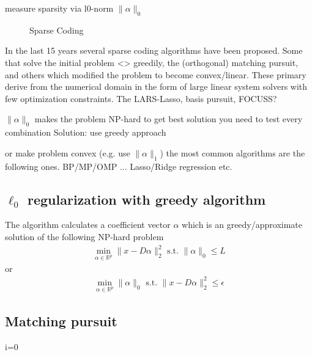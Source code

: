 measure sparsity via       l0-norm       $\lVert\alpha\rVert_{0}$

\begin{figure}
\centering
\caption{Sparse Coding}
\label{fig:da_x}
\end{figure}


In the last 15 years several sparse coding algorithms have been proposed. 
Some that solve the initial problem <> greedily, the (orthogonal) matching pursuit, and others which modified the problem to become convex/linear. These primary derive from the numerical domain in the form of 
large linear system solvers with few optimization constraints. The LARS-Lasso, basis pursuit, FOCUSS?


$\lVert\alpha\rVert_{0}$ makes the problem NP-hard
to get best solution you need to test every combination
Solution:
use greedy approach 

or make problem convex (e.g. use $\lVert\alpha\rVert_{1}$)
the most common algorithms are the following ones.
BP/MP/OMP ...
Lasso/Ridge regression etc.



\subsection {$\ell_0$ regularization with greedy algorithm}

The algorithm calculates a coefficient vector $\alpha$ which is an greedy/approximate solution of the following NP-hard problem
\begin{align}
\min_{\alpha\in\mathbb{R}^{p}}  \lVert x - D\alpha \rVert^{2}_{2} \textrm{ s.t. } \lVert \alpha \rVert_{0} \leq L
\end{align}
or
\begin{align}
\min_{\alpha\in\mathbb{R}^{p}}   \lVert \alpha \rVert_{0}   \textrm{ s.t. } \lVert x - D\alpha \rVert^{2}_{2} \leq \epsilon
\end{align}
\cite{Mallat1993}

\subsection*{Matching pursuit}
\begin{algorithm}
\begin{algorithmic}
\STATE i=0
\end{algorithmic}
\end{algorithm}

